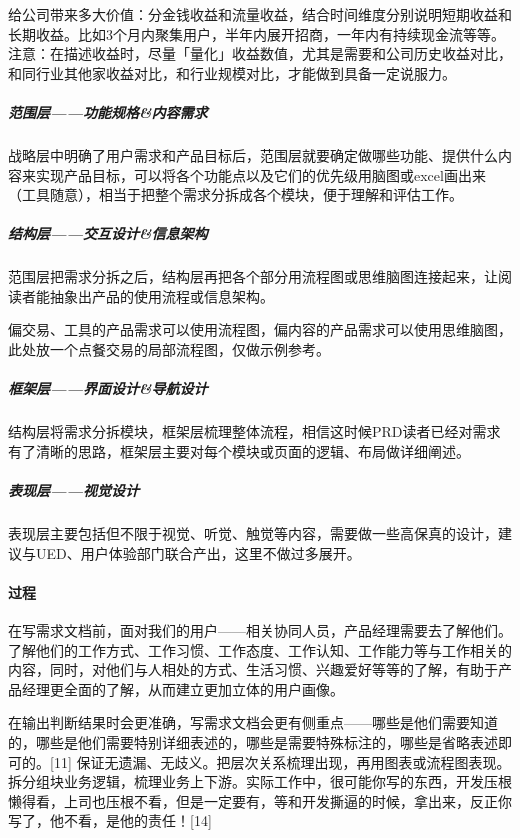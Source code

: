 \documentclass[letterpaper,11pt,english]{sphinxmanual}
\begin{document}
给公司带来多大价值：分金钱收益和流量收益，结合时间维度分别说明短期收益和长期收益。比如3个月内聚集用户，半年内展开招商，一年内有持续现金流等等。
注意：在描述收益时，尽量「量化」收益数值，尤其是需要和公司历史收益对比，和同行业其他家收益对比，和行业规模对比，才能做到具备一定说服力。%
\begin{footnote}[491]\sphinxAtStartFootnote
{}
%
\end{footnote}


\subparagraph{范围层——功能规格\&内容需求}
\label{\detokenize{chapter_knowledge/PRD:id4}}
战略层中明确了用户需求和产品目标后，范围层就要确定做哪些功能、提供什么内容来实现产品目标，可以将各个功能点以及它们的优先级用脑图或excel画出来（工具随意），相当于把整个需求分拆成各个模块，便于理解和评估工作。


\subparagraph{结构层——交互设计\&信息架构}
\label{\detokenize{chapter_knowledge/PRD:id5}}
范围层把需求分拆之后，结构层再把各个部分用流程图或思维脑图连接起来，让阅读者能抽象出产品的使用流程或信息架构。

偏交易、工具的产品需求可以使用流程图，偏内容的产品需求可以使用思维脑图，此处放一个点餐交易的局部流程图，仅做示例参考。


\subparagraph{框架层——界面设计\&导航设计}
\label{\detokenize{chapter_knowledge/PRD:id6}}
结构层将需求分拆模块，框架层梳理整体流程，相信这时候PRD读者已经对需求有了清晰的思路，框架层主要对每个模块或页面的逻辑、布局做详细阐述。


\subparagraph{表现层——视觉设计}
\label{\detokenize{chapter_knowledge/PRD:id7}}
表现层主要包括但不限于视觉、听觉、触觉等内容，需要做一些高保真的设计，建议与UED、用户体验部门联合产出，这里不做过多展开。


\paragraph{过程}
\label{\detokenize{chapter_knowledge/PRD:id8}}
在写需求文档前，面对我们的用户——相关协同人员，产品经理需要去了解他们。了解他们的工作方式、工作习惯、工作态度、工作认知、工作能力等与工作相关的内容，同时，对他们与人相处的方式、生活习惯、兴趣爱好等等的了解，有助于产品经理更全面的了解，从而建立更加立体的用户画像。

在输出判断结果时会更准确，写需求文档会更有侧重点——哪些是他们需要知道的，哪些是他们需要特别详细表述的，哪些是需要特殊标注的，哪些是省略表述即可的。{[}11{]}
保证无遗漏、无歧义。把层次关系梳理出现，再用图表或流程图表现。拆分组块业务逻辑，梳理业务上下游。实际工作中，很可能你写的东西，开发压根懒得看，上司也压根不看，但是一定要有，等和开发撕逼的时候，拿出来，反正你写了，他不看，是他的责任！{[}14{]}
\end{document}

